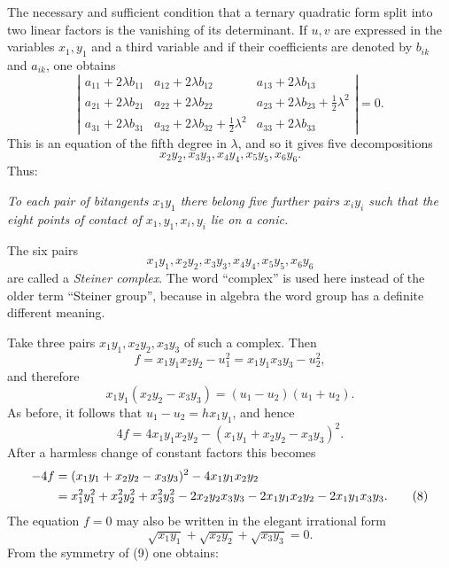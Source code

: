 \documentclass[11pt]{article}
\begin{document}
The necessary and sufficient condition that a ternary quadratic form split into two linear factors is the vanishing of its determinant. If \(u,v\) are expressed in the variables \(x_1,y_1\) and a third variable and if their coefficients are denoted by \(b_{ik}\) and \(a_{ik}\), one obtains
\begin{equation}
 \left|\begin{array}{ccc}
 a_{11}+2\lambda b_{11}&a_{12}+2\lambda b_{12}&a_{13}+2\lambda b_{13}\\
 a_{21}+2\lambda b_{21}&a_{22}+2\lambda b_{22}&a_{23}+2\lambda b_{23}+\tfrac12\lambda^2\\
 a_{31}+2\lambda b_{31}&a_{32}+2\lambda b_{32}+\tfrac12\lambda^2&a_{33}+2\lambda b_{33}
 \end{array}\right|=0.
 \tag{6}
\end{equation}
This is an equation of the fifth degree in \(\lambda\), and so it gives five decompositions
\[
 x_2y_2,
 x_3y_3,
 x_4y_4,
 x_5y_5,
 x_6y_6.
\]
Thus:

\emph{To each pair of bitangents \(x_1y_1\) there belong five further pairs \(x_iy_i\) such that the eight points of contact of \(x_1,y_1,x_i,y_i\) lie on a conic.}

The six pairs
\[
 x_1y_1,
 x_2y_2,
 x_3y_3,
 x_4y_4,
 x_5y_5,
 x_6y_6
\]
are called a \emph{Steiner complex}. The word ``complex'' is used here instead of the older term ``Steiner group'', because in algebra the word group has a definite different meaning.

Take three pairs \(x_1y_1,x_2y_2,x_3y_3\) of such a complex. Then
\[
 f=x_1y_1x_2y_2-u_1^2=x_1y_1x_3y_3-u_2^2,
\]
and therefore
\[
 x_1y_1(x_2y_2-x_3y_3)=(u_1-u_2)(u_1+u_2).
\]
As before, it follows that \(u_1-u_2=hx_1y_1\), and hence
\begin{equation}
 4f=4x_1y_1x_2y_2-(x_1y_1+x_2y_2-x_3y_3)^2.
 \tag{7}
\end{equation}
After a harmless change of constant factors this becomes
\begin{align}
 -4f&=(x_1y_1+x_2y_2-x_3y_3)^2-4x_1y_1x_2y_2\notag\\
 &=x_1^2y_1^2+x_2^2y_2^2+x_3^2y_3^2
 -2x_2y_2x_3y_3-2x_1y_1x_2y_2-2x_1y_1x_3y_3.
 \tag{8}
\end{align}
The equation \(f=0\) may also be written in the elegant irrational form
\begin{equation}
 \sqrt{x_1y_1}+\sqrt{x_2y_2}+\sqrt{x_3y_3}=0.
 \tag{9}
\end{equation}
From the symmetry of (9) one obtains:
\end{document}
